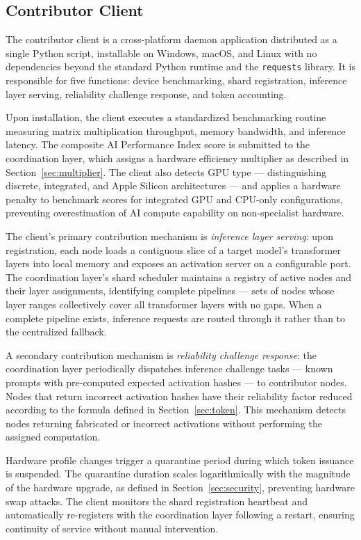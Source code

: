 \documentclass[12pt]{article}
\begin{document}
\subsection{Contributor Client}

The contributor client is a cross-platform daemon application distributed as a single Python script, installable on Windows, macOS, and Linux with no dependencies beyond the standard Python runtime and the \texttt{requests} library. It is responsible for five functions: device benchmarking, shard registration, inference layer serving, reliability challenge response, and token accounting.

Upon installation, the client executes a standardized benchmarking routine measuring matrix multiplication throughput, memory bandwidth, and inference latency. The composite AI Performance Index score is submitted to the coordination layer, which assigns a hardware efficiency multiplier as described in Section~\ref{sec:multiplier}. The client also detects GPU type — distinguishing discrete, integrated, and Apple Silicon architectures — and applies a hardware penalty to benchmark scores for integrated GPU and CPU-only configurations, preventing overestimation of AI compute capability on non-specialist hardware.

The client's primary contribution mechanism is \textit{inference layer serving}: upon registration, each node loads a contiguous slice of a target model's transformer layers into local memory and exposes an activation server on a configurable port. The coordination layer's shard scheduler maintains a registry of active nodes and their layer assignments, identifying complete pipelines — sets of nodes whose layer ranges collectively cover all transformer layers with no gaps. When a complete pipeline exists, inference requests are routed through it rather than to the centralized fallback.

A secondary contribution mechanism is \textit{reliability challenge response}: the coordination layer periodically dispatches inference challenge tasks — known prompts with pre-computed expected activation hashes — to contributor nodes. Nodes that return incorrect activation hashes have their reliability factor reduced according to the formula defined in Section~\ref{sec:token}. This mechanism detects nodes returning fabricated or incorrect activations without performing the assigned computation.

Hardware profile changes trigger a quarantine period during which token issuance is suspended. The quarantine duration scales logarithmically with the magnitude of the hardware upgrade, as defined in Section~\ref{sec:security}, preventing hardware swap attacks. The client monitors the shard registration heartbeat and automatically re-registers with the coordination layer following a restart, ensuring continuity of service without manual intervention.
\end{document}
